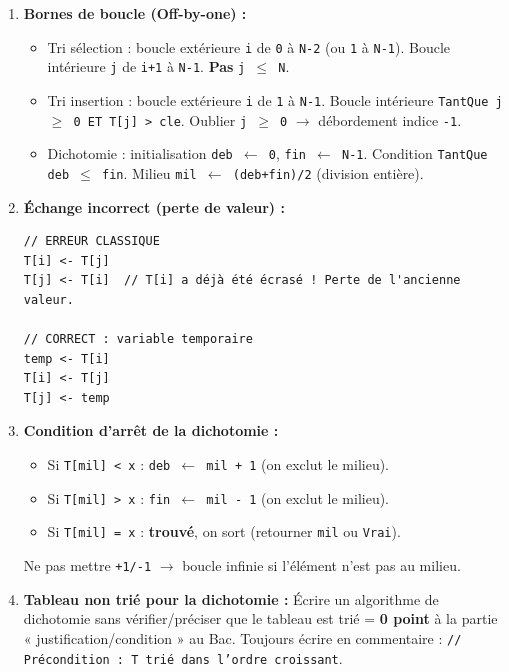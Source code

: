 \documentclass[11pt]{article}
\begin{document}
\begin{attention}
\begin{enumerate}
    \item \textbf{Bornes de boucle (Off-by-one) :} 
    \begin{itemize}
        \item Tri sélection : boucle extérieure \texttt{i} de \texttt{0} à \texttt{N-2} (ou \texttt{1} à \texttt{N-1}). Boucle intérieure \texttt{j} de \texttt{i+1} à \texttt{N-1}. \textbf{Pas} \texttt{j $\le$ N}.
        \item Tri insertion : boucle extérieure \texttt{i} de \texttt{1} à \texttt{N-1}. Boucle intérieure \texttt{TantQue j $\ge$ 0 ET T[j] > cle}. Oublier \texttt{j $\ge$ 0} $\rightarrow$ débordement indice \texttt{-1}.
        \item Dichotomie : initialisation \texttt{deb $\leftarrow$ 0}, \texttt{fin $\leftarrow$ N-1}. Condition \texttt{TantQue deb $\le$ fin}. Milieu \texttt{mil $\leftarrow$ (deb+fin)/2} (division entière).
    \end{itemize}
    \item \textbf{Échange incorrect (perte de valeur) :} 
    \begin{lstlisting}
// ERREUR CLASSIQUE
T[i] <- T[j]
T[j] <- T[i]  // T[i] a déjà été écrasé ! Perte de l'ancienne valeur.

// CORRECT : variable temporaire
temp <- T[i]
T[i] <- T[j]
T[j] <- temp
\end{lstlisting}
    \item \textbf{Condition d'arrêt de la dichotomie :} 
    \begin{itemize}
        \item Si \texttt{T[mil] < x} : \texttt{deb $\leftarrow$ mil + 1} (on exclut le milieu).
        \item Si \texttt{T[mil] > x} : \texttt{fin $\leftarrow$ mil - 1} (on exclut le milieu).
        \item Si \texttt{T[mil] = x} : \textbf{trouvé}, on sort (retourner \texttt{mil} ou \texttt{Vrai}).
    \end{itemize}
    Ne pas mettre \texttt{+1/-1} $\rightarrow$ boucle infinie si l'élément n'est pas au milieu.
    \item \textbf{Tableau non trié pour la dichotomie :} Écrire un algorithme de dichotomie sans vérifier/préciser que le tableau est trié = \textbf{0 point} à la partie « justification/condition » au Bac. Toujours écrire en commentaire : \texttt{// Précondition : T trié dans l'ordre croissant}.
\end{enumerate}
\end{attention}
\end{document}
